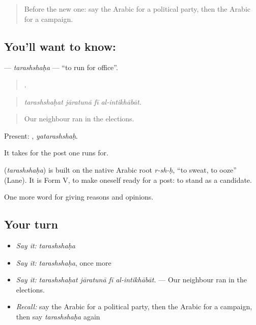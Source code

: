 \begin{quote}
Before the new one: say the Arabic for a political party, then the Arabic for a campaign.
\end{quote}

\subsection*{You'll want to know: }
\textbf{} — \emph{tarashshaḥa} — \textquotedblleft{}to run for office\textquotedblright{}.

\begin{quote}
   .
\end{quote}

\begin{quote}
\emph{tarashshaḥat jāratunā fī al-intikhābāt.}
\end{quote}

\begin{quote}
Our neighbour ran in the elections.
\end{quote}

Present: , \emph{yatarashshaḥ}.

It takes  for the post one runs for.

\begin{cousinweb}
\textbf{} (\emph{tarashshaḥa}) is built on the native Arabic root \emph{r-sh-ḥ}, \textquotedblleft{}to sweat, to ooze\textquotedblright{} (Lane). It is Form V, to make oneself ready for a post: to stand as a candidate.
\end{cousinweb}

\begin{grammarlens}[title={What you've built}]
One more word for giving reasons and opinions.
\end{grammarlens}

\subsection*{Your turn}
\begin{itemize}
\raggedright
  \item \emph{Say it:} \emph{tarashshaḥa}
  \item \emph{Say it:} \emph{tarashshaḥa}, once more
  \item \emph{Say it:} \emph{tarashshaḥat jāratunā fī al-intikhābāt.} — Our neighbour ran in the elections.
  \item \emph{Recall:} say the Arabic for a political party, then the Arabic for a campaign, then say \emph{tarashshaḥa} again
\end{itemize}

